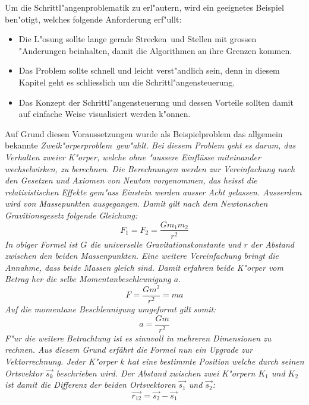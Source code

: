 \begin{refsection}
Um die Schrittl"angenproblematik zu erl"autern, wird ein geeignetes Beispiel ben"otigt, welches folgende Anforderung erf"ullt: 
\begin{itemize}
\item Die L"osung sollte \glqq lange gerade Strecken\grqq~und Stellen mit grossen "Anderungen beinhalten, damit die Algorithmen an ihre Grenzen kommen.
\item Das Problem sollte schnell und leicht verst"andlich sein, denn in diesem Kapitel geht es schliesslich um die Schrittl"angensteuerung.
\item Das Konzept der Schrittl"angensteuerung und dessen Vorteile sollten damit auf einfache Weise visualisiert werden k"onnen.
\end{itemize}
Auf Grund diesen Voraussetzungen wurde als Beispielproblem das allgemein bekannte \em Zweik"orperproblem\em~gew"ahlt.
Bei diesem Problem geht es darum, das Verhalten zweier K"orper, welche ohne "aussere Einflüsse miteinander wechselwirken, zu berechnen. 
Die Berechnungen werden zur Vereinfachung nach den Gesetzen und Axiomen von Newton vorgenommen, das heisst die relativistischen Effekte gem"ass Einstein werden ausser Acht gelassen.
Ausserdem wird von Massepunkten ausgegangen.
Damit gilt nach dem Newtonschen Gravitionsgesetz folgende Gleichung:
\begin{equation} \label{eq:newton}
F_1 = F_2=\frac{G m_1 m_2}{r^2}
\end{equation}
In obiger Formel ist $G$ die universelle Gravitationskonstante und $r$ der Abstand zwischen den beiden Massenpunkten.
Eine weitere Vereinfachung bringt die Annahme, dass beide Massen gleich sind. 
Damit erfahren beide K"orper vom Betrag her die selbe Momentanbeschleunigung $a$.
\begin{equation}
F=\frac{G m^2}{r^2}=m a
\end{equation}
Auf die momentane Beschleunigung umgeformt gilt somit:
\begin{equation}
a=\frac{G m}{r^2} \label{eq:beschleunigungSkalar}
\end{equation}
F"ur die weitere Betrachtung ist es sinnvoll in mehreren Dimensionen zu rechnen.
Aus diesem Grund erfährt die Formel nun ein Upgrade zur Vektorrechnung.
Jeder K"orper $k$ hat eine bestimmte Position welche durch seinen Ortsvektor $\vec{s_k}$ beschrieben wird.
Der Abstand zwischen zwei K"orpern $K_1$ und $K_2$ ist damit die Differenz der beiden Ortsvektoren  $\vec{s_1}$ und $\vec{s_2}$:
\begin{equation} \label{eq:abstand}
\vec{r_{12}}= \vec{s_2}-\vec{s_1}

\end{equation}
\end{refsection}
